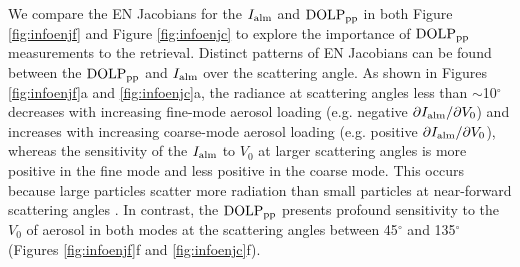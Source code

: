 We compare the EN Jacobians for the $I_\text{alm}$ and $\text{DOLP}_\text{pp}$ in both 
Figure \ref{fig:infoenjf} and Figure \ref{fig:infoenjc} to explore the 
importance of $\text{DOLP}_\text{pp}$ measurements to the retrieval. Distinct patterns of EN 
Jacobians can be found between the $\text{DOLP}_\text{pp}$ and $I_\text{alm}$ over the
scattering angle. As shown in Figures \ref{fig:infoenjf}a and
\ref{fig:infoenjc}a, the radiance at scattering angles less than
$\sim$10$^\circ$ decreases with increasing fine-mode aerosol loading (e.g.
negative $\partial I_\text{alm}/\partial{V_0}$) and increases with increasing 
coarse-mode aerosol loading (e.g. positive $\partial I_\text{alm}/\partial{V_0}$), 
whereas the sensitivity of the $I_\text{alm}$ to $V_0$ at larger scattering angles is 
more positive in the fine mode and less positive in the coarse mode. 
This occurs because large particles scatter more radiation than small particles at 
near-forward scattering angles \citep{vandeHulst81}. In contrast, the $\text{DOLP}_\text{pp}$ 
presents profound sensitivity to the $V_0$ of aerosol in both modes at the 
scattering angles between 45$^\circ$ and 135$^\circ$ (Figures 
\ref{fig:infoenjf}f and \ref{fig:infoenjc}f). 

